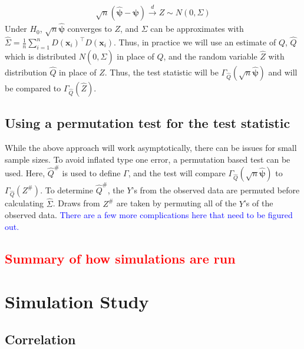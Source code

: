 \documentclass{article}
\newcommand{\sh}{\textcolor{red}}
\newcommand{\rvv}{Z}
\newcommand{\distv}{Q}
\begin{document}
\begin{align*}
    \sqrt{n}\left(\hat{\boldsymbol{\psi}} - \boldsymbol{\psi}\right) \xrightarrow{d} Z \sim N\left(0, \Sigma\right)
\end{align*}
Under $H_0$, $\sqrt{n}\hat{\boldsymbol{\psi}}$ converges to $Z$, and $\Sigma$ can be approximates with $\widehat{\Sigma} = \frac{1}{n}\sum_{i = 1}^n D(\boldsymbol{x}_i)^\top D(\boldsymbol{x}_i)$.  Thus, in practice we will use an estimate of $\distv$, $\hat{\distv}$ which is distributed $N(0, \widehat{\Sigma})$ in place of $\distv$, and the random variable $\hat{\rvv}$ with distribution $\hat{\distv}$ in place of $\rvv$.  Thus, the test statistic will be $\Gamma_{\hat{\distv}}(\sqrt{n} \hat{\boldsymbol{\psi}})$ and will be compared to $\Gamma_{\hat{\distv}}(\hat{\rvv})$.

\subsection{Using a permutation test for the test statistic}
While the above approach will work asymptotically, there can be issues for small sample sizes.  To avoid inflated type one error, a permutation based test can be used.  Here, $\hat{\distv}^\#$ is used to define $\Gamma$, and the test will compare $\Gamma_{\hat{\distv}}(\sqrt{n} \hat{\boldsymbol{\psi}})$ to $\Gamma_{\hat{\distv}}(\rvv^\#)$. To determine $\hat{\distv}^\#$, the $Y$'s from the observed data are permuted before calculating $\widehat \Sigma$.  Draws from $\rvv^\#$ are taken by permuting all of the $Y$'s of the observed data.  \textcolor{blue}{There are a few more complications here that need to be figured out.}

\sh{\subsection{Summary of how simulations are run}}

\section{Simulation Study}
\label{sec:sim_stdy}
\subsection{Correlation}
\end{document}
